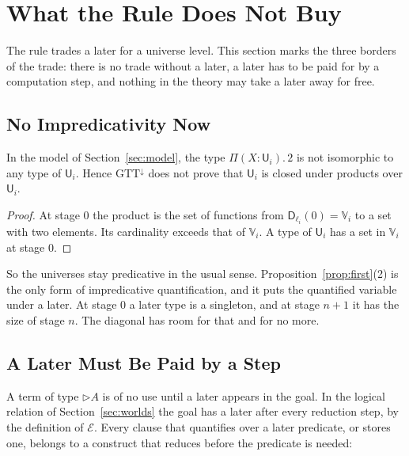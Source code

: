 \documentclass[acmsmall,nonacm,screen]{acmart}
\newcommand{\later}{{\triangleright}}
\newcommand{\Uv}{\mathsf{U}}
\newcommand{\Vg}{\mathbb{V}}
\newcommand{\Dg}{\mathsf{D}}
\newcommand{\Er}{\mathcal{E}}
\begin{document}
\section{What the Rule Does Not Buy}\label{sec:limits}

The rule trades a later for a universe level. This section marks the three borders of the
trade: there is no trade without a later, a later has to be paid for by a computation step,
and nothing in the theory may take a later away for free.

\subsection{No Impredicativity Now}

\begin{proposition}\label{prop:nonow}
In the model of Section~\ref{sec:model}, the type $\Pi(X : \Uv_i).\,2$ is not isomorphic to
any type of $\Uv_i$. Hence $\mathrm{GTT}^{\downarrow}$ does not prove that $\Uv_i$ is closed
under products over $\Uv_i$.
\end{proposition}

\begin{proof}
At stage $0$ the product is the set of functions from $\Dg_{\ell_i}(0) = \Vg_i$ to a set
with two elements. Its cardinality exceeds that of $\Vg_i$. A type of $\Uv_i$ has a set in
$\Vg_i$ at stage $0$.
\end{proof}

So the universes stay predicative in the usual sense. Proposition~\ref{prop:first}(2) is the
only form of impredicative quantification, and it puts the quantified variable under a
later. At stage $0$ a later type is a singleton, and at stage $n+1$ it has the size of
stage $n$. The diagonal has room for that and for no more.

\subsection{A Later Must Be Paid by a Step}\label{sec:nostep}

A term of type $\later A$ is of no use until a later appears in the goal. In the logical
relation of Section~\ref{sec:worlds} the goal has a later after every reduction step, by
the definition of $\Er$. Every clause that quantifies over a later predicate, or stores
one, belongs to a construct that reduces before the predicate is needed:
\end{document}
